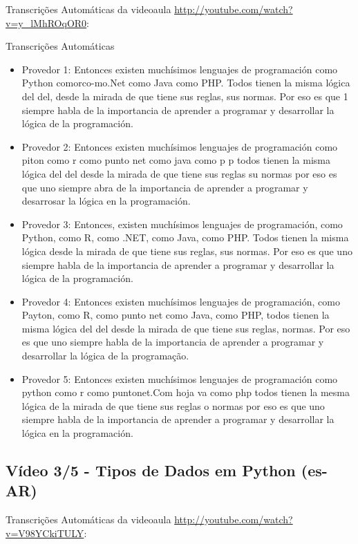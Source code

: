 \noindent
Transcrições Automáticas da videoaula \url{http://youtube.com/watch?v=y_lMhROqOR0}:

Transcrições Automáticas

\begin{itemize}
    \item Provedor 1: Entonces existen muchísimos lenguajes de programación como Python comorco-mo.Net como Java como PHP. Todos tienen la misma lógica del del, desde la mirada de que tiene sus reglas, sus normas. Por eso es que 1 siempre habla de la importancia de aprender a programar y desarrollar la lógica de la programación.
    \item Provedor 2: Entonces existen muchísimos lenguajes de programación como piton como r como punto net como java como p p todos tienen la misma lógica del del desde la mirada de que tiene sus reglas su normas por eso es que uno siempre abra de la importancia de aprender a programar y desarrosar la lógica en la programación.
    \item Provedor 3: Entonces, existen muchísimos lenguajes de programación, como Python, como R, como .NET, como Java, como PHP. Todos tienen la misma lógica desde la mirada de que tiene sus reglas, sus normas. Por eso es que uno siempre habla de la importancia de aprender a programar y desarrollar la lógica de la programación.
    \item Provedor 4: Entonces existen muchísimos lenguajes de programación, como Payton, como R, como punto net como Java, como PHP, todos tienen la misma lógica del del desde la mirada de que tiene sus reglas, normas. Por eso es que uno siempre habla de la importancia de aprender a programar y desarrollar la lógica de la programação.
    \item Provedor 5: Entonces existen muchísimos lenguajes de programación como python como r como puntonet.Com hoja va como php todos tienen la mesma lógica de la mirada de que tiene sus reglas o normas por eso es que uno siempre habla de la importancia de aprender a programar y desarrollar la lógica en la programación.
\end{itemize}

\subsection{Vídeo 3/5 - Tipos de Dados em Python (es-AR)}

\noindent
Transcrições Automáticas da videoaula \url{http://youtube.com/watch?v=V98YCkiTULY}:

